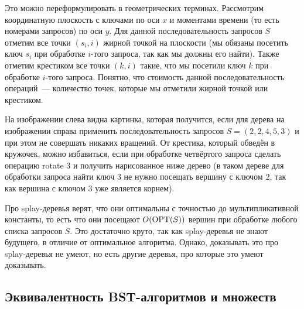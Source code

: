 Это можно переформулировать в геометрических терминах. Рассмотрим координатную
плоскость с ключами по оси $x$ и моментами времени (то есть номерами запросов) по 
оси $y$. Для данной последовательность запросов $S$ отметим все точки $(s_i, i)$ 
жирной точкой на плоскости (мы обязаны посетить ключ $s_i$ при обработке $i$-того
запроса, так как мы должны его найти). Также отметим крестиком все точки $(k, i)$ такие,
что мы посетили ключ $k$ при обработке $i$-того запроса. Понятно, что стоимость данной
последовательность операций~--- количество точек, которые мы отметили жирной точкой
или крестиком. 


На изображении слева видна картинка, которая получится, если для дерева на изображении
справа применить последовательность запросов $S = (2, 2, 4, 5, 3)$ и при этом не совершать
никаких вращений. От крестика, который обведён в кружочек, можно избавиться, если 
при обработке четвёртого запроса сделать операцию \textrm{rotate 3} и получить нарисованное ниже дерево (в таком дереве для обработки запроса \textrm{найти ключ 3} не нужно посещать вершину с ключом $2$, так как вершина с ключом $3$ уже является корнем).

Про splay-деревья верят, что они оптимальны с точностью до мультипликативной константы,
то есть что они посещают $O(\operatorname{OPT}(S))$ вершин при обработке любого списка запросов $S$. Это достаточно круто, так как splay-деревья не знают будущего,
в отличие от оптимальное алгоритма. Однако, доказывать это про splay-деревья не умеют,
но есть другие деревья, про которые это умеют доказывать.


\subsection{Эквивалентность BST-алгоритмов и \arbs множеств}

